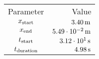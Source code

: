 \begin{tabular}{cr}
    \toprule
    Parameter & Value \\ \otoprule
    $x_{\textup{start}}$    & $\unit[3.40]{m}$ \\
    $x_{\textup{end}}$      & $\unit[5.49 \cdot 10^{-2}]{m}$ \\
    $t_{\textup{start}}$    & $\unit[3.12 \cdot 10^{1}]{s}$ \\
    $t_{\textup{duration}}$ & $\unit[4.98]{s}$ \\
    \bottomrule
\end{tabular}
